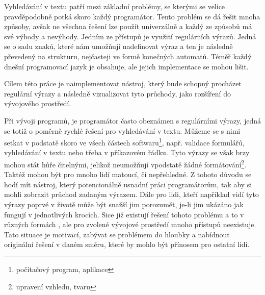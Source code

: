 Vyhledávání v textu patří mezi základní problémy, se kterými se velice pravděpodobně potká skoro každý programátor. 
Tento problém se dá řešit mnoha způsoby, avšak ne všechna řešení lze použít univerzálně a každý ze způsobů má své výhody a nevýhody.
Jedním ze přístupů je využití regulárních výrazů. Jedná se o sadu znaků, které nám umožňují nadefinovat výraz a ten je následně převedený na strukturu, nejčasteji ve formě konečných automatů.
Téměř každý dnešní programovací jazyk je obsahuje, ale jejich implementace se mohou lišit.

Cílem této práce je naimplementovat nástroj, který bude schopný procházet regulární výrazy a následně vizualizovat tyto průchody, jako rozšíření do vývojového prostředí.

Při vývoji programů, je programátor často obeznámen s regulárními výrazy, jedná se totiž o poměrně rychlé řešení pro vyhledávání v textu. 
Můžeme se s nimi setkat v podstatě skoro ve všech částech softwaru\footnote{počítačový program, aplikace}, např. validace formulářů, vyhledávání v textu nebo třeba v příkazovém řádku.
Tyto výrazy se však brzy mohou stát hůře čitelnými, jelikož neumožňují vpodstatě žádné formátování\footnote{upravení vzhledu, tvaru}. 
Taktéž mohou být pro mnoho lidí matoucí, či nepřehledné.
Z tohoto důvodu se hodí mít nástroj, který potencionálně usnadní práci programátorům, tak aby si mohli zobrazit průchod zadaným výrazem.
Dále pro lidi, kteří například vidí tyto výrazy poprvé v životě může být snažší jim porozumět, je-li jim ukázáno jak fungují v jednotlivých krocích.
Sice již existují řešení tohoto problému a to v různých formách \cite{Dib, Regexper, RegExr}, ale pro zvolené vývojové prostředí mnoho přístupů neexistuje.
Tato situace je motivací, zabývat se problémem do hloubky a nabídnout originální řešení v daném směru, které by mohlo být přínosem pro ostatní lidi.

\endinput